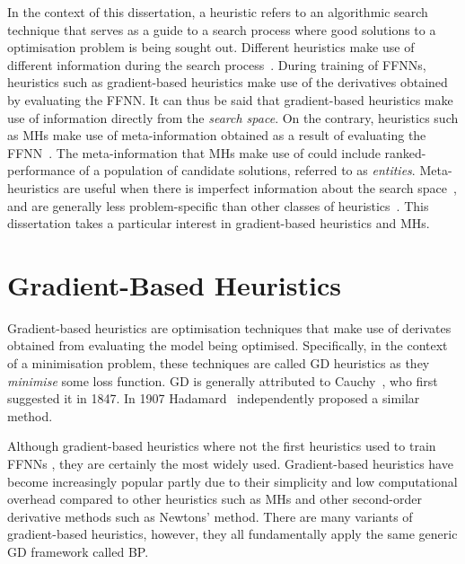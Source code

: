 In the context of this dissertation, a heuristic refers to an algorithmic search technique that serves as a guide to a search process where good solutions to a optimisation problem is being sought out. Different heuristics make use of different information during the search process~\cite{ref:kheiri:2017}. During training of \acp{FFNN}, heuristics such as gradient-based heuristics make use of the derivatives obtained by evaluating the \acs{FFNN}. It can thus be said that gradient-based heuristics make use of information directly from the \textit{search space}. On the contrary, heuristics such as \acp{MH} make use of meta-information obtained as a result of evaluating the \acs{FFNN}~\cite{ref:blum:2003}. The meta-information that \acp{MH} make use of could include ranked-performance of a population of candidate solutions, referred to as \textit{entities}. Meta-heuristics are useful when there is imperfect information about the search space~\cite{ref:bianchi:2009}, and are generally less problem-specific than other classes of heuristics~\cite{ref:blum:2003}. This dissertation takes a particular interest in gradient-based heuristics and \acp{MH}.


\section{Gradient-Based Heuristics}\label{sec:heuristics:gd}

Gradient-based heuristics are optimisation techniques that make use of derivates obtained from evaluating the model being optimised. Specifically, in the context of a minimisation problem, these techniques are called \acf{GD} heuristics as they \textit{minimise} some loss function. \Acs{GD} is generally attributed to Cauchy~\cite{ref:lemarechal:2012}, who first suggested it in 1847. In 1907 Hadamard~\cite{ref:hadamard:1908} independently proposed a similar method.

Although gradient-based heuristics where not the first heuristics used to train \acp{FFNN}
\cite{ref:engelbrecht:2007}, they are certainly the most widely used. Gradient-based heuristics have become increasingly popular partly due to their simplicity and low computational overhead compared to other heuristics such as \acp{MH} and other second-order derivative methods such as Newtons' method. There are many variants of gradient-based heuristics, however, they all fundamentally apply the same generic \acf{GD} framework called \acf{BP}.

